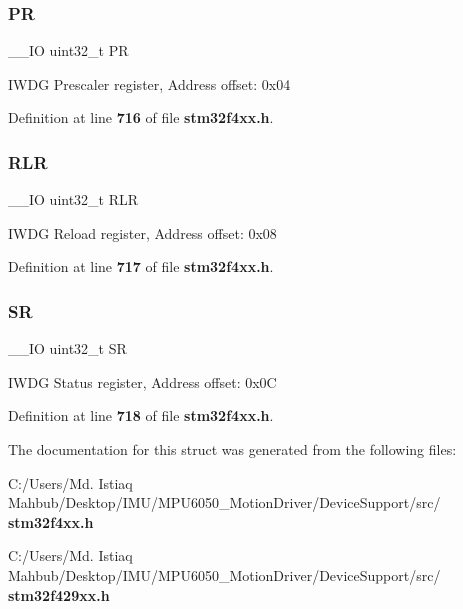 \subsubsection{PR}
{\footnotesize\ttfamily \+\_\+\+\_\+\+IO uint32\+\_\+t PR}

I\+W\+DG Prescaler register, Address offset\+: 0x04 

Definition at line \textbf{ 716} of file \textbf{ stm32f4xx.\+h}.

\mbox{\label{structIWDG__TypeDef_a7015e1046dbd3ea8783b33dc11a69e52}} 
\subsubsection{R\+LR}
{\footnotesize\ttfamily \+\_\+\+\_\+\+IO uint32\+\_\+t R\+LR}

I\+W\+DG Reload register, Address offset\+: 0x08 

Definition at line \textbf{ 717} of file \textbf{ stm32f4xx.\+h}.

\mbox{\label{structIWDG__TypeDef_af6aca2bbd40c0fb6df7c3aebe224a360}} 
\subsubsection{SR}
{\footnotesize\ttfamily \+\_\+\+\_\+\+IO uint32\+\_\+t SR}

I\+W\+DG Status register, Address offset\+: 0x0C 

Definition at line \textbf{ 718} of file \textbf{ stm32f4xx.\+h}.



The documentation for this struct was generated from the following files\+:\begin{DoxyCompactItemize}
\item 
C\+:/\+Users/\+Md. Istiaq Mahbub/\+Desktop/\+I\+M\+U/\+M\+P\+U6050\+\_\+\+Motion\+Driver/\+Device\+Support/src/\textbf{ stm32f4xx.\+h}\item 
C\+:/\+Users/\+Md. Istiaq Mahbub/\+Desktop/\+I\+M\+U/\+M\+P\+U6050\+\_\+\+Motion\+Driver/\+Device\+Support/src/\textbf{ stm32f429xx.\+h}\end{DoxyCompactItemize}
